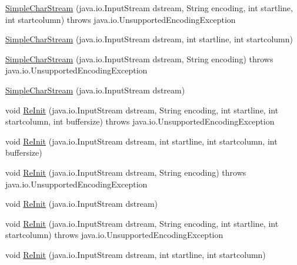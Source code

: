 \begin{DoxyCompactItemize}
\item 
\mbox{\hyperlink{classorg_1_1tec_1_1comp_1_1interpreter_1_1_simple_char_stream_a7c15fb8623a1cc4b8d5ca6b6040ea776}{Simple\+Char\+Stream}} (java.\+io.\+Input\+Stream dstream, String encoding, int startline, int startcolumn)  throws java.\+io.\+Unsupported\+Encoding\+Exception   
\item 
\mbox{\hyperlink{classorg_1_1tec_1_1comp_1_1interpreter_1_1_simple_char_stream_ab4a6ff6e1263d82e95b6d5a0ccd1c5e2}{Simple\+Char\+Stream}} (java.\+io.\+Input\+Stream dstream, int startline, int startcolumn)
\item 
\mbox{\hyperlink{classorg_1_1tec_1_1comp_1_1interpreter_1_1_simple_char_stream_a730e371b090656ad63888ac7bcba8937}{Simple\+Char\+Stream}} (java.\+io.\+Input\+Stream dstream, String encoding)  throws java.\+io.\+Unsupported\+Encoding\+Exception   
\item 
\mbox{\hyperlink{classorg_1_1tec_1_1comp_1_1interpreter_1_1_simple_char_stream_a542b9bfda052ff0ab05197b5aacaa23f}{Simple\+Char\+Stream}} (java.\+io.\+Input\+Stream dstream)
\item 
void \mbox{\hyperlink{classorg_1_1tec_1_1comp_1_1interpreter_1_1_simple_char_stream_aca44a2d9a6772c7bc7f053a4eb915aaf}{Re\+Init}} (java.\+io.\+Input\+Stream dstream, String encoding, int startline, int startcolumn, int buffersize)  throws java.\+io.\+Unsupported\+Encoding\+Exception   
\item 
void \mbox{\hyperlink{classorg_1_1tec_1_1comp_1_1interpreter_1_1_simple_char_stream_a311dc2b9b3c78982c9e8ad3b7284534b}{Re\+Init}} (java.\+io.\+Input\+Stream dstream, int startline, int startcolumn, int buffersize)
\item 
void \mbox{\hyperlink{classorg_1_1tec_1_1comp_1_1interpreter_1_1_simple_char_stream_a65710eecb20d17635dabb2f912e647af}{Re\+Init}} (java.\+io.\+Input\+Stream dstream, String encoding)  throws java.\+io.\+Unsupported\+Encoding\+Exception   
\item 
void \mbox{\hyperlink{classorg_1_1tec_1_1comp_1_1interpreter_1_1_simple_char_stream_a0f73ad5fc621b999092f0fb0faf7d3da}{Re\+Init}} (java.\+io.\+Input\+Stream dstream)
\item 
void \mbox{\hyperlink{classorg_1_1tec_1_1comp_1_1interpreter_1_1_simple_char_stream_a5f60c6936ec079b6058b31dd4b9e250a}{Re\+Init}} (java.\+io.\+Input\+Stream dstream, String encoding, int startline, int startcolumn)  throws java.\+io.\+Unsupported\+Encoding\+Exception   
\item 
void \mbox{\hyperlink{classorg_1_1tec_1_1comp_1_1interpreter_1_1_simple_char_stream_aab179dca39c38fe8a53febfc1d054fef}{Re\+Init}} (java.\+io.\+Input\+Stream dstream, int startline, int startcolumn)
\end{DoxyCompactItemize}
